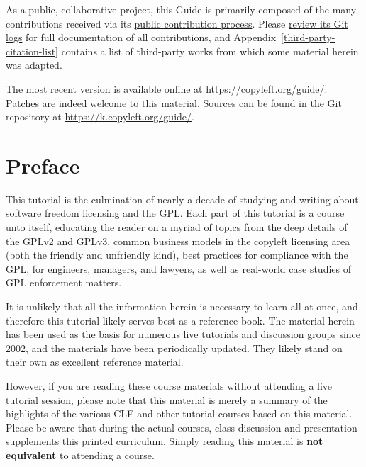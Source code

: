 \documentclass[10pt, letterpaper, openany, oneside]{book}
\begin{document}
\begin{titlepage}
\begin{center}
{\vfill

As a public, collaborative project, this Guide is primarily composed of the
many contributions received via its
\href{https://k.copyleft.org/guide/files/master/CONTRIBUTING.md}{public
  contribution process}.  Please
\href{https://k.copyleft.org/guide/changelog/master/}{review its
  Git logs} for full documentation of all contributions, and
Appendix~\ref{third-party-citation-list}
  contains a list of third-party works from which some material herein was
adapted.

The most recent version is
available online at \url{https://copyleft.org/guide/}.  Patches
are indeed welcome to this material.  Sources can be found in the Git
repository at \url{https://k.copyleft.org/guide/}.
}
\end{center}

\end{titlepage}

\tableofcontents

\chapter{Preface}

This tutorial is the culmination of nearly a decade of studying and writing
about software freedom licensing and the GPL\@.  Each part of this tutorial
is a course unto itself, educating the reader on a myriad of topics from the
deep details of the GPLv2 and GPLv3, common business models in the copyleft
licensing area (both the friendly and unfriendly kind), best practices for
compliance with the GPL, for engineers, managers, and lawyers, as well as
real-world case studies of GPL enforcement matters.

It is unlikely that all the information herein is necessary to learn all at
once, and therefore this tutorial likely serves best as a reference book.
The material herein has been used as the basis for numerous live tutorials
and discussion groups since 2002, and the materials have been periodically
updated.   They likely stand on their own as excellent reference material.

However, if you are reading these course materials without attending a live
tutorial session, please note that this material is merely a summary of the
highlights of the various CLE and other tutorial courses based on this
material.  Please be aware that during the actual courses, class discussion
and presentation supplements this printed curriculum.  Simply reading this
material is \textbf{not equivalent} to attending a course.
\end{document}

